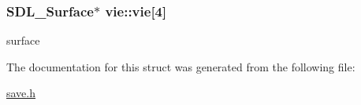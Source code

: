 \subsubsection[{\texorpdfstring{vie}{vie}}]{\setlength{\rightskip}{0pt plus 5cm}S\+D\+L\+\_\+\+Surface$\ast$ vie\+::vie\mbox{[}4\mbox{]}}\hypertarget{structvie_a2c29f60898de16e1306bd1043fa38dc9}{}\label{structvie_a2c29f60898de16e1306bd1043fa38dc9}
surface 

The documentation for this struct was generated from the following file\+:\begin{DoxyCompactItemize}
\item 
\hyperlink{save_8h}{save.\+h}\end{DoxyCompactItemize}
